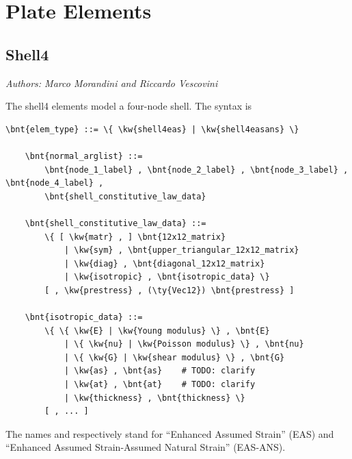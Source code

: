 %
%
%
%
%
% 
%
%

\section{Plate Elements}
\label{sec:EL:PLATE}


\subsection{Shell4}
\label{sec:EL:PLATE:SHELL4}

\emph{Authors: Marco Morandini and Riccardo Vescovini}

The shell4 elements model a four-node shell.
The syntax is
\begin{Verbatim}[commandchars=\\\{\}]
    \bnt{elem_type} ::= \{ \kw{shell4eas} | \kw{shell4easans} \}

    \bnt{normal_arglist} ::=
        \bnt{node_1_label} , \bnt{node_2_label} , \bnt{node_3_label} , \bnt{node_4_label} ,
        \bnt{shell_constitutive_law_data}

    \bnt{shell_constitutive_law_data} ::=
        \{ [ \kw{matr} , ] \bnt{12x12_matrix}
            | \kw{sym} , \bnt{upper_triangular_12x12_matrix}
            | \kw{diag} , \bnt{diagonal_12x12_matrix}
            | \kw{isotropic} , \bnt{isotropic_data} \}
        [ , \kw{prestress} , (\ty{Vec12}) \bnt{prestress} ]

    \bnt{isotropic_data} ::=
        \{ \{ \kw{E} | \kw{Young modulus} \} , \bnt{E}
            | \{ \kw{nu} | \kw{Poisson modulus} \} , \bnt{nu}
            | \{ \kw{G} | \kw{shear modulus} \} , \bnt{G}
            | \kw{as} , \bnt{as}    # TODO: clarify
            | \kw{at} , \bnt{at}    # TODO: clarify
            | \kw{thickness} , \bnt{thickness} \}
        [ , ... ]
\end{Verbatim}
The names  and  respectively stand for
``Enhanced Assumed Strain'' (EAS)
and ``Enhanced Assumed Strain-Assumed Natural Strain'' (EAS-ANS).

